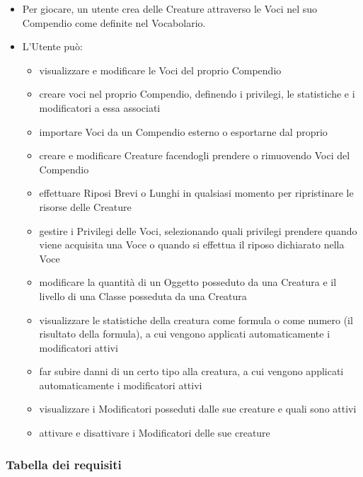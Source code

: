 \documentclass[a4paper, 11pt]{article}
\begin{document}
\begin{itemize}
    \item Per giocare, un utente crea delle Creature attraverso le Voci nel suo Compendio come definite nel Vocabolario.
    \item L’Utente può:
    \begin{itemize}
        \item visualizzare e modificare le Voci del proprio Compendio
        \item creare voci nel proprio Compendio, definendo i privilegi, le statistiche e i modificatori a essa associati
        \item importare Voci da un Compendio esterno o esportarne dal proprio
        \item creare e modificare Creature facendogli prendere o rimuovendo Voci del Compendio
        \item effettuare Riposi Brevi o Lunghi in qualsiasi momento per ripristinare le risorse delle Creature
        \item gestire i Privilegi delle Voci, selezionando quali privilegi prendere quando viene acquisita una Voce o quando si effettua il riposo dichiarato nella Voce
        \item modificare la quantità di un Oggetto posseduto da una Creatura e il livello di una Classe posseduta da una Creatura
        \item visualizzare le statistiche della creatura come formula o come numero (il risultato della formula), a cui vengono applicati automaticamente i modificatori attivi
        \item far subire danni di un certo tipo alla creatura, a cui vengono applicati automaticamente i modificatori attivi
        \item visualizzare i Modificatori posseduti dalle sue creature e quali sono attivi
        \item attivare e disattivare i Modificatori delle sue creature
    \end{itemize}
\end{itemize}


\newcommand\rf{\stepcounter{rf}\therf}
\newcommand\rnf{\stepcounter{rnf}\thernf}
\newpage
\subsubsection{Tabella dei requisiti}
\end{document}
